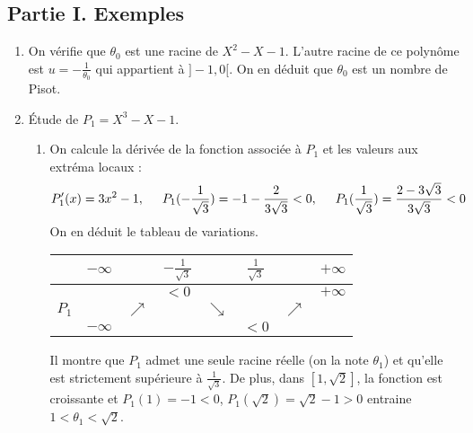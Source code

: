 \subsection*{Partie I. Exemples}
\begin{enumerate}
 \item On vérifie que $\theta_0$ est une racine de $X^2-X-1$. L'autre racine de ce polynôme est $u=-\frac{1}{\theta_0}$ qui appartient à $]-1,0[$. On en déduit que $\theta_0$ est un nombre de Pisot.
 \item \'Etude de $P_1=X^3-X-1$.
\begin{enumerate}
 \item On calcule la dérivée de la fonction associée à $P_1$ et les valeurs aux extréma locaux :
\begin{displaymath}
 P_1'(x) = 3x^2-1,\hspace{0.5cm} P_1(-\frac{1}{\sqrt{3}})=-1-\frac{2}{3\sqrt{3}}<0
,\hspace{0.5cm} P_1(\frac{1}{\sqrt{3}})=\frac{2-3\sqrt{3}}{3\sqrt{3}}<0
\end{displaymath}
On en déduit le tableau de variations.
\begin{center}
\renewcommand{\arraystretch}{1.8}
\begin{tabular}{|c|ccccccc|} \hline
      & $-\infty$&          & $-\frac{1}{\sqrt{3}}$ &          & $\frac{1}{\sqrt{3}}$ &          & $+\infty$\\ \hline
      &          &          & $<0$                 &          &                      &          & $+\infty$\\ 
$P_1$ &          &$\nearrow$&                      &$\searrow$&                      &$\nearrow$&  \\ 
      & $-\infty$&          &                      &          & $<0$                 &          & \\ \hline
\end{tabular}
\end{center}
Il montre que $P_1$ admet une seule racine réelle (on la note $\theta_1$) et qu'elle est strictement supérieure à $\frac{1}{\sqrt{3}}$. De plus, dans $[1,\sqrt{2}]$, la fonction est croissante et $P_1(1)=-1<0$, $P_1(\sqrt{2})=\sqrt{2}-1>0$ entraine $1<\theta_1<\sqrt{2}$.


\end{enumerate}
\end{enumerate}
